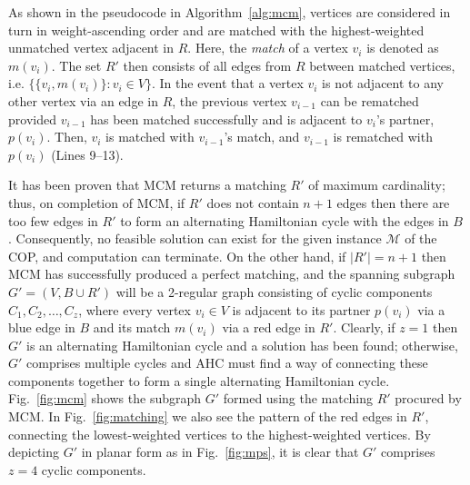 \documentclass[a4paper,11pt,authoryear]{elsarticle}
\newcommand{\rev}[1]{{\color{myRed}#1}}
\begin{document}
\noindent As shown in the pseudocode in Algorithm~\ref{alg:mcm}, vertices are considered in turn in weight-ascending order and are matched with the highest-weighted unmatched vertex adjacent in $R$. Here, the \emph{match} of a vertex $v_i$ is denoted as $m(v_i)$. The set $R'$ then consists of all edges from $R$ between matched vertices, i.e. $\{\{v_i, m(v_i)\} : v_i \in V \}$. In the event that a vertex $v_i$ is not adjacent to any other vertex via an edge in $R$, the previous vertex $v_{i-1}$ can be rematched provided $v_{i-1}$ has been matched successfully and is adjacent to $v_i$'s partner, $p(v_i)$. Then, $v_i$ is matched with $v_{i-1}$'s match, and $v_{i-1}$ is rematched with $p(v_i)$ (Lines 9--13).

\rev{It has been proven that MCM returns a matching $R'$ of maximum cardinality; thus, on completion of MCM, if $R'$ does not contain $n+1$ edges then there are too few edges in $R'$ to form an alternating Hamiltonian cycle with the edges in $B$ \citep{hawa2020t}. Consequently, no feasible solution can exist for the given instance $\mathcal{M}$ of the COP, and computation can terminate.} On the other hand, if $|R'|=n+1$ then MCM has successfully produced a perfect matching, and the spanning subgraph $G'=(V, B \cup R')$ will be a 2-regular graph consisting of cyclic components $C_1, C_2,\dotsc,C_z$, \rev{where every vertex $v_i \in V$ is adjacent to its partner $p(v_i)$ via a blue edge in $B$ and its match $m(v_i)$ via a red edge in $R'$.} Clearly, if $z=1$ then $G'$ is an alternating Hamiltonian cycle and a solution has been found; otherwise, $G'$ comprises multiple cycles and AHC must find a way of connecting these components together to form a single alternating Hamiltonian cycle. \rev{Fig.~\ref{fig:mcm} shows the subgraph $G'$ formed using the matching $R'$ procured by MCM. In Fig.~\ref{fig:matching} we also see the pattern of the red edges in $R'$, connecting the lowest-weighted vertices to the highest-weighted vertices. By depicting $G'$ in planar form as in Fig.~\ref{fig:mps}, it is clear that $G'$ comprises $z=4$ cyclic components.}
\end{document}
